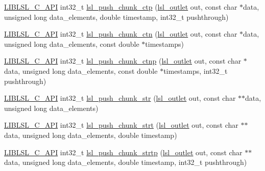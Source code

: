 \begin{DoxyCompactItemize}
\item 
\hyperlink{lsl__cpp_8h_aafd0ef1813e8be84a1420c4f1df64615}{L\+I\+B\+L\+S\+L\+\_\+\+C\+\_\+\+A\+PI} int32\+\_\+t \hyperlink{namespacelsl_ad8287dab0124b1f1d8a682e914116550}{lsl\+\_\+push\+\_\+chunk\+\_\+ctp} (\hyperlink{namespacelsl_abcf512b0f66dacf86c10b165995fd50b}{lsl\+\_\+outlet} out, const char $\ast$data, unsigned long data\+\_\+elements, double timestamp, int32\+\_\+t pushthrough)
\item 
\hyperlink{lsl__cpp_8h_aafd0ef1813e8be84a1420c4f1df64615}{L\+I\+B\+L\+S\+L\+\_\+\+C\+\_\+\+A\+PI} int32\+\_\+t \hyperlink{namespacelsl_a2a72461381a3cfa39a33dc07312a72a6}{lsl\+\_\+push\+\_\+chunk\+\_\+ctn} (\hyperlink{namespacelsl_abcf512b0f66dacf86c10b165995fd50b}{lsl\+\_\+outlet} out, const char $\ast$data, unsigned long data\+\_\+elements, const double $\ast$timestamps)
\item 
\hyperlink{lsl__cpp_8h_aafd0ef1813e8be84a1420c4f1df64615}{L\+I\+B\+L\+S\+L\+\_\+\+C\+\_\+\+A\+PI} int32\+\_\+t \hyperlink{namespacelsl_a1ce559595e2b4ac431bda67fc49ec102}{lsl\+\_\+push\+\_\+chunk\+\_\+ctnp} (\hyperlink{namespacelsl_abcf512b0f66dacf86c10b165995fd50b}{lsl\+\_\+outlet} out, const char $\ast$data, unsigned long data\+\_\+elements, const double $\ast$timestamps, int32\+\_\+t pushthrough)
\item 
\hyperlink{lsl__cpp_8h_aafd0ef1813e8be84a1420c4f1df64615}{L\+I\+B\+L\+S\+L\+\_\+\+C\+\_\+\+A\+PI} int32\+\_\+t \hyperlink{namespacelsl_af3a72a206c0eac2ac180b31e5fbaf28f}{lsl\+\_\+push\+\_\+chunk\+\_\+str} (\hyperlink{namespacelsl_abcf512b0f66dacf86c10b165995fd50b}{lsl\+\_\+outlet} out, const char $\ast$$\ast$data, unsigned long data\+\_\+elements)
\item 
\hyperlink{lsl__cpp_8h_aafd0ef1813e8be84a1420c4f1df64615}{L\+I\+B\+L\+S\+L\+\_\+\+C\+\_\+\+A\+PI} int32\+\_\+t \hyperlink{namespacelsl_a3327c2e5a83c90e02270743916c302e3}{lsl\+\_\+push\+\_\+chunk\+\_\+strt} (\hyperlink{namespacelsl_abcf512b0f66dacf86c10b165995fd50b}{lsl\+\_\+outlet} out, const char $\ast$$\ast$data, unsigned long data\+\_\+elements, double timestamp)
\item 
\hyperlink{lsl__cpp_8h_aafd0ef1813e8be84a1420c4f1df64615}{L\+I\+B\+L\+S\+L\+\_\+\+C\+\_\+\+A\+PI} int32\+\_\+t \hyperlink{namespacelsl_a9317d0fe8f576fb80e58e362a39e12e1}{lsl\+\_\+push\+\_\+chunk\+\_\+strtp} (\hyperlink{namespacelsl_abcf512b0f66dacf86c10b165995fd50b}{lsl\+\_\+outlet} out, const char $\ast$$\ast$data, unsigned long data\+\_\+elements, double timestamp, int32\+\_\+t pushthrough)
\item 
$$
\end{DoxyCompactItemize}
